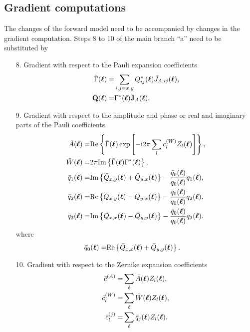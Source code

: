 \documentclass[reprint,aps,pra,superscriptaddress,
amsmath,amssymb]{revtex4-1}
\begin{document}
\subsection{Gradient computations}

The changes of the forward model need to be accompanied by changes in the gradient computation. Steps 8 to 10 of the main branch ``a'' need to be substituted by
\begin{enumerate}
\item[8.] Gradient with respect to the Pauli expansion coefficients
\begin{align*}
\bar  \Gamma (\boldsymbol \ell) =& \sum_{i,j = x,y}  Q_{ij}^*(\boldsymbol \ell) \bar{J}_{A,ij} (\boldsymbol \ell),\\
\bar{ \textbf Q } (\boldsymbol \ell) =& \Gamma^* (\boldsymbol \ell) \bar{\textbf J}_A (\boldsymbol \ell) .
\end{align*}
\item[9.] Gradient with respect to the amplitude and phase or real and imaginary parts of the Pauli coefficients
\begin{align*}
\bar A(\boldsymbol \ell) =&   \text{Re} \left\{ \bar \Gamma (\boldsymbol \ell)  \exp \left[ -\text{i} 2 \pi \sum_l c_{l}^{(W)} Z_l(\boldsymbol \ell) \right] \right\} ,\\
\bar W(\boldsymbol \ell)=& 2\pi \text{Im}\left\{\bar \Gamma (\boldsymbol \ell)  \Gamma^*(\boldsymbol \ell)  \right\} , \\
\bar q_1 (\boldsymbol \ell) =& \text{Im} \left\{ \bar Q_{x,y}(\boldsymbol \ell) + \bar Q_{y,x}(\boldsymbol \ell)\right\} - \frac{\bar q_0(\boldsymbol \ell)}{q_0(\boldsymbol \ell)} q_1(\boldsymbol \ell),\\
\bar q_2 (\boldsymbol \ell) =& \text{Re} \left\{ \bar Q_{x,y}(\boldsymbol \ell) - \bar Q_{y,x}(\boldsymbol \ell)\right\} - \frac{\bar q_0(\boldsymbol \ell)}{q_0(\boldsymbol \ell)} q_2(\boldsymbol \ell), \\
\bar q_3 (\boldsymbol \ell) =&\text{Im} \left\{\bar Q_{x,x}(\boldsymbol \ell) - \bar Q_{y,y}(\boldsymbol \ell)  \right\} - \frac{\bar q_0(\boldsymbol \ell)}{q_0(\boldsymbol \ell)} q_3(\boldsymbol \ell) .
\end{align*}
where
\begin{align*}
\bar q_0 (\boldsymbol \ell) =&  \text{Re} \left\{ \bar Q_{x,x}(\boldsymbol \ell)+\bar Q_{y,y}(\boldsymbol \ell) \right\} .
\end{align*}
\item[10.] Gradient with respect to the Zernike expansion coefficients 
\begin{align*}
\bar c^{(A)} = &  \sum_{\boldsymbol \ell} \bar A(\boldsymbol \ell) Z_l(\boldsymbol \ell), \\
\bar c_{l}^{(W)} = & \sum_{\boldsymbol \ell} \bar W (\boldsymbol \ell) Z_l(\boldsymbol \ell), \\
\bar c_{l}^{(j)} = & \sum_{\boldsymbol \ell}  \bar q_j (\boldsymbol \ell) Z_l(\boldsymbol \ell) .
\end{align*}
\end{enumerate}
\end{document}

